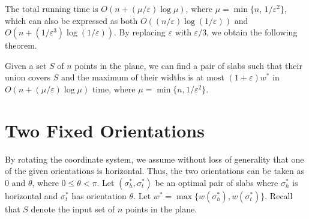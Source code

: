 \documentclass[english,a4paper, cleveref, autoref, thm-restate, nolineno]{socg-lipics-v2021}
\theoremstyle{star}
\theoremstyle{claimstar}
\newcommand{\eps}{\ensuremath{\varepsilon}}
\begin{document}
The total running time is 
$O(n + (\mu/\eps)\log \mu )$, where $ \mu = \min\{n,\, 1/\eps^2\}$, 
which can also be expressed as both $O((n/\eps)\log(1/\eps))$ and $O(n + (1/\eps^3)\log(1/\eps))$. 
By replacing $\eps$ with $\eps/3$, we obtain the following theorem.





\begin{theorem}
    Given a set $S$ of $n$ points in the plane, we can find a pair of slabs such that their union covers $S$ and the maximum of their widths is at most $(1+\eps)w^*$ in $O(n + (\mu/\eps) \log \mu)$ time, where $\mu = \min \{n, 1/\eps^2 \}$.
\end{theorem}

\section{Two Fixed Orientations}
\label{sec:two_fixed}



By rotating the coordinate system, we assume without loss of generality that one of the given orientations is horizontal. Thus, the two orientations can be taken as $0$ and $\theta$, where $0 \leq \theta < \pi$.
Let $(\sigma_h^*, \sigma_t^* )$ be an optimal pair of slabs where $\sigma_h^*$ is horizontal and $\sigma_t^*$ has orientation $\theta$.
Let $w^* = \max \{w(\sigma_h^*), w(\sigma_t^*) \}$.
Recall that $S$ denote the input set of $n$ points in the plane.

\end{document}
